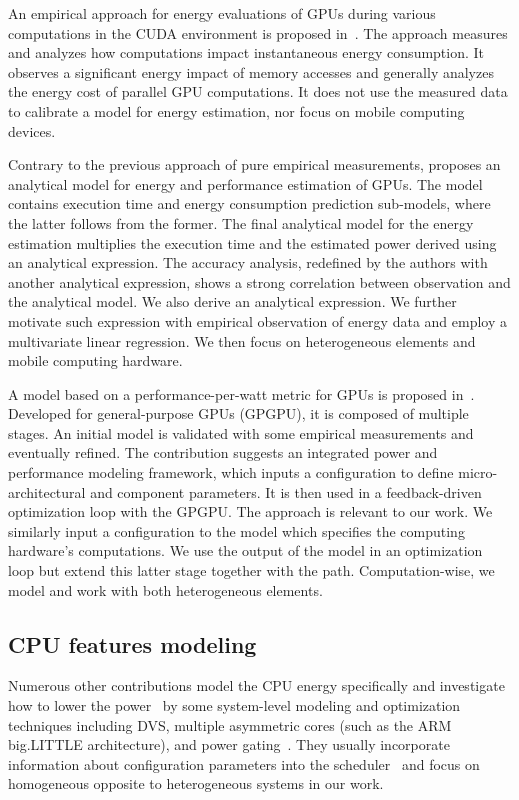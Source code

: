 An empirical approach for energy evaluations of GPUs during various computations in the CUDA environment is proposed in~\citep{collange2009power}. The approach measures and analyzes how computations impact instantaneous energy consumption. It observes a significant energy impact of memory accesses and generally analyzes the energy cost of parallel GPU computations. It does not use the measured data to calibrate a model for energy estimation, nor focus on mobile computing devices.

Contrary to the previous approach of pure empirical measurements, \citep{luo2011performance} proposes an analytical model for energy and performance estimation of GPUs. The model contains execution time and energy consumption prediction sub-models, where the latter follows from the former. The final analytical model for the energy estimation multiplies the execution time and the estimated power derived using an analytical expression. The accuracy analysis, redefined by the authors with another analytical expression, shows a strong correlation between observation and the analytical model. We also derive an analytical expression. We further motivate such expression with empirical observation of energy data and employ a multivariate linear regression. We then focus on heterogeneous elements and mobile computing hardware.

A model based on a performance-per-watt metric for GPUs is proposed in~\citep{leng2013gpuwattch}. Developed for general-purpose GPUs (GPGPU), it is composed of multiple stages. An initial model is validated with some empirical measurements and eventually refined.  The contribution suggests an integrated power and performance modeling framework, which inputs a configuration to define micro-architectural and component parameters. It is then used in a feedback-driven optimization loop with the GPGPU. The approach is relevant to our work. We similarly input a configuration to the model which specifies the computing hardware's computations. We use the output of the model in an optimization loop but extend this latter stage together with the path. Computation-wise, we model and work with both heterogeneous elements.

\subsection{CPU features modeling}
\label{sec:soa-cpu}

Numerous other contributions model the CPU energy specifically and investigate how to lower the power~\citep{hong1999power, luo2001battery, chowdhury2005static} by some system-level modeling and optimization techniques including DVS, multiple asymmetric cores (such as the ARM big.LITTLE architecture), and power gating~\citep{walker2017accurate}. They usually incorporate information about configuration parameters into the scheduler~\citep{seewald2019coarse} and focus on homogeneous opposite to heterogeneous systems in our work. 

